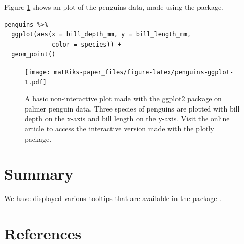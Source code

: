 Figure \ref{fig:penguins-ggplot} shows an plot of the penguins data, made using the  package.

\begin{verbatim}
penguins %>% 
  ggplot(aes(x = bill_depth_mm, y = bill_length_mm, 
             color = species)) + 
  geom_point()
\end{verbatim}

\begin{figure}
\centering
\texttt{[image: matRiks-paper\_files/figure-latex/penguins-ggplot-1.pdf]}
\caption{\label{fig:penguins-ggplot}A basic non-interactive plot made with the ggplot2 package on palmer penguin data. Three species of penguins are plotted with bill depth on the x-axis and bill length on the y-axis. Visit the online article to access the interactive version made with the plotly package.}
\end{figure}

\hypertarget{summary}{%
\section{Summary}\label{summary}}

We have displayed various tooltips that are available in the package .

\hypertarget{references}{%
\section*{References}\label{references}}

